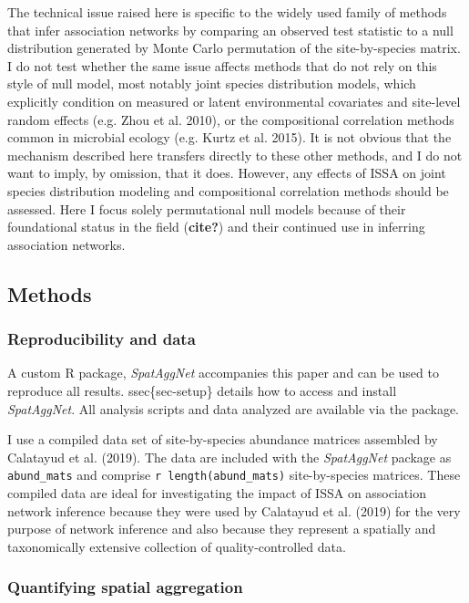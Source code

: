\documentclass[
  letterpaper,
  DIV=11,
  numbers=noendperiod]{scrartcl}
\begin{document}
The technical issue raised here is specific to the widely used family of
methods that infer association networks by comparing an observed test
statistic to a null distribution generated by Monte Carlo permutation of
the site-by-species matrix. I do not test whether the same issue affects
methods that do not rely on this style of null model, most notably joint
species distribution models, which explicitly condition on measured or
latent environmental covariates and site-level random effects (e.g. Zhou
et al. 2010), or the compositional correlation methods common in
microbial ecology (e.g. Kurtz et al. 2015). It is not obvious that the
mechanism described here transfers directly to these other methods, and
I do not want to imply, by omission, that it does. However, any effects
of ISSA on joint species distribution modeling and compositional
correlation methods should be assessed. Here I focus solely
permutational null models because of their foundational status in the
field (\textbf{cite?}) and their continued use in inferring association
networks.

\subsection{Methods}\label{methods}

\subsubsection{Reproducibility and data}\label{reproducibility-and-data}

A custom R package, \emph{SpatAggNet} accompanies this paper and can be
used to reproduce all results. ssec\{sec-setup\} details how to access
and install \emph{SpatAggNet}. All analysis scripts and data analyzed
are available via the package.

I use a compiled data set of site-by-species abundance matrices
assembled by Calatayud et al. (2019). The data are included with the
\emph{SpatAggNet} package as \texttt{abund\_mats} and comprise
\texttt{\textbar{}r\ length(abund\_mats)} site-by-species matrices.
These compiled data are ideal for investigating the impact of ISSA on
association network inference because they were used by Calatayud et al.
(2019) for the very purpose of network inference and also because they
represent a spatially and taxonomically extensive collection of
quality-controlled data.

\subsubsection{Quantifying spatial
aggregation}\label{quantifying-spatial-aggregation}
\end{document}
